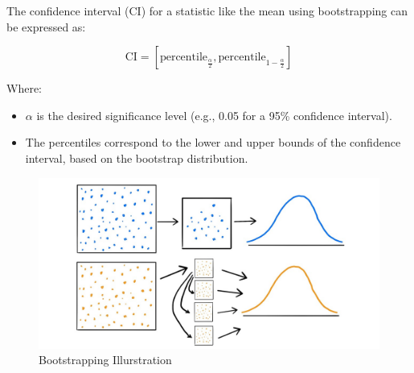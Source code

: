 \documentclass[12pt]{article}  %
\begin{document}
The confidence interval (CI) for a statistic like the mean using bootstrapping can be expressed as:

\begin{equation}
    \text{CI} = \left[ \text{percentile}_{\frac{\alpha}{2}}, \text{percentile}_{1-\frac{\alpha}{2}} \right] \tag{5}
\end{equation}


Where:

\begin{itemize}
    \item \( \alpha \) is the desired significance level (e.g., 0.05 for a 95\% confidence interval).
    \item The percentiles correspond to the lower and upper bounds of the confidence interval, based on the bootstrap distribution.
\end{itemize}
\begin{figure}[H]
    \centering
    \includegraphics[width=0.5\linewidth]{Bootstrapping.png}
    \caption{Bootstrapping Illurstration}
    \label{fig:enter-label}
\end{figure}
\end{document}
